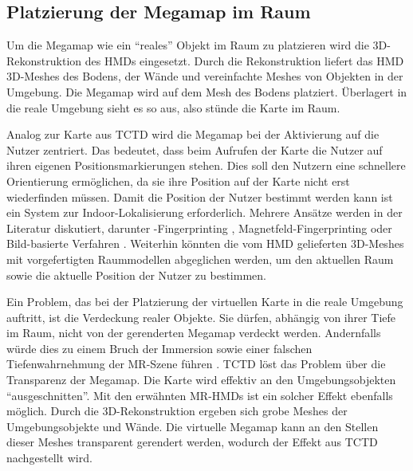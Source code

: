 \subsection{Platzierung der Megamap im Raum}
Um die Megamap wie ein \enquote{reales} Objekt im Raum zu platzieren wird die 3D-Rekonstruktion des HMDs eingesetzt.
Durch die Rekonstruktion liefert das HMD 3D-Meshes des Bodens, der Wände und vereinfachte Meshes von Objekten in der Umgebung.
Die Megamap wird auf dem Mesh des Bodens platziert.
Überlagert in die reale Umgebung sieht es so aus, also stünde die Karte im Raum.

Analog zur Karte aus TCTD wird die Megamap bei der Aktivierung auf die Nutzer zentriert.
Das bedeutet, dass beim Aufrufen der Karte die Nutzer auf ihren eigenen Positionsmarkierungen stehen.
Dies soll den Nutzern eine schnellere Orientierung ermöglichen, da sie ihre Position auf der Karte nicht erst wiederfinden müssen.
Damit die Position der Nutzer bestimmt werden kann ist ein System zur Indoor-Lokalisierung erforderlich.
Mehrere Ansätze werden in der Literatur diskutiert, darunter \wifi-Fingerprinting \parencite{Lautenschlaeger2012, Alnabhan2014}, Magnetfeld-Fingerprinting \parencite{Hashish2017, Ang2018} oder Bild-basierte Verfahren \parencite{Kalkusch2002, Moeller2014, Silva2015}.
Weiterhin könnten die vom HMD gelieferten 3D-Meshes mit vorgefertigten Raummodellen abgeglichen werden, um den aktuellen Raum sowie die aktuelle Position der Nutzer zu bestimmen.

Ein Problem, das bei der Platzierung der virtuellen Karte in die reale Umgebung auftritt, ist die Verdeckung realer Objekte.
Sie dürfen, abhängig von ihrer Tiefe im Raum, nicht von der gerenderten Megamap verdeckt werden.
Andernfalls würde dies zu einem Bruch der Immersion sowie einer falschen Tiefenwahrnehmung der MR-Szene führen \cite{Kasperi2017, Walton2017}.
TCTD löst das Problem über die Transparenz der Megamap.
Die Karte wird effektiv an den Umgebungsobjekten \enquote{ausgeschnitten}.
Mit den erwähnten MR-HMDs ist ein solcher Effekt ebenfalls möglich.
Durch die 3D-Rekonstruktion ergeben sich grobe Meshes der Umgebungsobjekte und Wände.
Die virtuelle Megamap kann an den Stellen dieser Meshes transparent gerendert werden, wodurch der Effekt aus TCTD nachgestellt wird.


